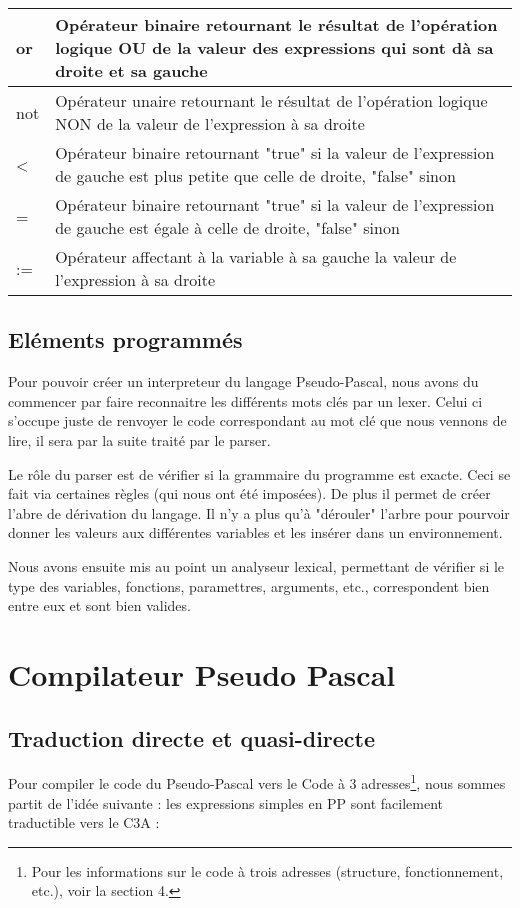 \documentclass{article}
\begin{document}
\begin{tabular}{|p{2cm}|p{11cm}|}
  or & Opérateur binaire retournant le résultat de l'opération logique OU de la valeur des expressions qui sont dà sa droite et sa gauche\\ \hline
  not & Opérateur unaire retournant le résultat de l'opération logique NON de la valeur de l'expression à sa droite \\ \hline
  < & Opérateur binaire retournant "true" si la valeur de l'expression de gauche est plus petite que celle de droite, "false" sinon\\ \hline
  = & Opérateur binaire retournant "true" si la valeur de l'expression de gauche est égale à celle de droite, "false" sinon\\ \hline
  := & Opérateur affectant à la variable à sa gauche la valeur de l'expression à sa droite \\ \hline
\end{tabular}



\subsection{Eléments programmés}

Pour pouvoir créer un interpreteur du langage Pseudo-Pascal, nous avons du commencer par faire reconnaitre les différents mots clés par un lexer. Celui ci s'occupe juste de renvoyer le code correspondant au mot clé que nous vennons de lire, il sera par la suite traité par le parser.

\smallbreak
Le rôle du parser est de vérifier si la grammaire du programme est exacte. Ceci se fait via certaines règles (qui nous ont été imposées). De plus il permet de créer l'abre de dérivation du langage. Il n'y a plus qu'à "dérouler" l'arbre pour pourvoir donner les valeurs aux différentes variables et les insérer dans un environnement.

\smallbreak
Nous avons ensuite mis au point un analyseur lexical, permettant de vérifier si le type des variables, fonctions, paramettres, arguments, etc., correspondent bien entre eux et sont bien valides.

\newpage
\section{Compilateur Pseudo Pascal}

\subsection{Traduction directe et quasi-directe}
Pour compiler le code du Pseudo-Pascal vers le Code à 3 adresses\footnote{Pour les informations sur le code à trois adresses (structure, fonctionnement, etc.), voir la section 4.}, nous sommes partit de l'idée suivante : les expressions simples en PP sont facilement traductible vers le C3A :
\end{document}
